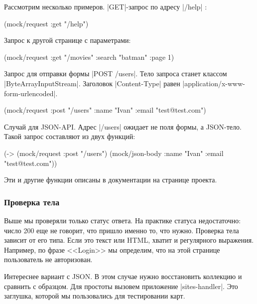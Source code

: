 Рассмотрим несколько примеров. \spverb|GET|-запрос по адресу \spverb|/help| :

\begin{english}
  \begin{clojure}
(mock/request :get "/help")
  \end{clojure}
\end{english}

Запрос к другой странице с параметрами:

\begin{english}
  \begin{clojure}
(mock/request :get "/movies" {:search "batman" :page 1})
  \end{clojure}
\end{english}

Запрос для отправки формы \spverb|POST /users|. Тело запроса станет классом
\spverb|ByteArrayInputStream|. Заголовок \spverb|Content-Type| равен
\spverb|application/x-www-form-urlencoded|.

\begin{english}
  \begin{clojure}
(mock/request :post "/users" {:name "Ivan" :email "test@test.com"})
  \end{clojure}
\end{english}

Случай для JSON-API. Адрес \spverb|/users| ожидает не поля формы, а
JSON-тело. Такой запрос составляют из двух функций:

\begin{english}
  \begin{clojure}
(-> (mock/request :post "/users")
    (mock/json-body {:name "Ivan" :email "test@test.com"}))
  \end{clojure}
\end{english}

Эти и другие функции описаны в документации на странице проекта.

\subsubsection*{Проверка тела}

Выше мы проверяли только статус ответа. На практике статуса недостаточно: число
200 еще не говорит, что пришло именно то, что нужно. Проверка тела зависит от
его типа. Если это текст или HTML, хватит и регулярного выражения. Например, по
фразе <<Login>> мы определим, что на этой странице пользователь не авторизован.

Интереснее вариант с JSON. В этом случае нужно восстановить коллекцию и сравнить
с образцом. Для простоты вызовем приложение \spverb|sites-handler|. Это
заглушка, которой мы пользовались для тестировании карт.

